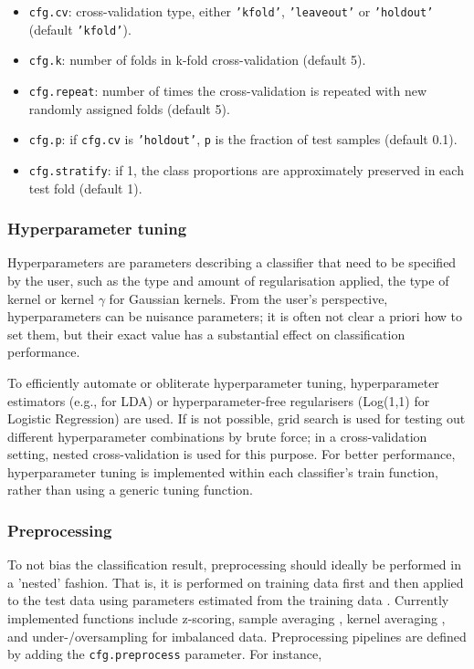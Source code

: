 \documentclass[utf8]{frontiersSCNS} %
\newcommand{\ttt}[1]{\texttt{#1}}
\begin{document}
\begin{itemize}
    \item \ttt{cfg.cv}: cross-validation type, either \ttt{'kfold'}, \ttt{'leaveout'} or \ttt{'holdout'} (default \ttt{'kfold'}).
    \item \ttt{cfg.k}: number of folds in k-fold cross-validation (default 5).
    \item \ttt{cfg.repeat}: number of times the cross-validation is repeated with new randomly assigned folds (default 5).
    \item \ttt{cfg.p}: if \ttt{cfg.cv} is \ttt{'holdout'}, \ttt{p} is the fraction of test samples (default 0.1).
    \item \ttt{cfg.stratify}: if 1, the class proportions are approximately preserved in each test fold (default 1).
\end{itemize}

\subsubsection{Hyperparameter tuning}

Hyperparameters are parameters describing a classifier that need to be specified by the user, such as the type and amount of regularisation applied, the type of kernel or kernel $\gamma$ for Gaussian kernels. From the user's perspective, hyperparameters can be nuisance parameters; it is often not clear a priori how to set them, but their exact value has a substantial effect on classification performance. 

To efficiently automate or obliterate hyperparameter tuning, hyperparameter estimators (e.g., \cite{Ledoit2003HoneyMatrix} for LDA) or hyperparameter-free regularisers (Log(1,1) for Logistic Regression) are used. If is not possible, grid search is used for testing out different hyperparameter combinations by brute force; in a cross-validation setting, nested cross-validation is used for this purpose. For better performance, hyperparameter tuning is implemented within each classifier's train function, rather than using a generic tuning function.

\subsubsection{Preprocessing}\label{sec:preprocessing}

To not bias the classification result, preprocessing should ideally be performed in a 'nested' fashion. That is, it is performed on training data first and then applied to the test data using parameters estimated from the training data \cite{Lemm2011}. Currently implemented functions include z-scoring, sample averaging \citep{Cichy2017MultivariateSpace}, kernel averaging \citep{Treder2018}, and under-/oversampling for imbalanced data. Preprocessing pipelines are defined by adding the \ttt{cfg.preprocess} parameter. For instance,
\end{document}
